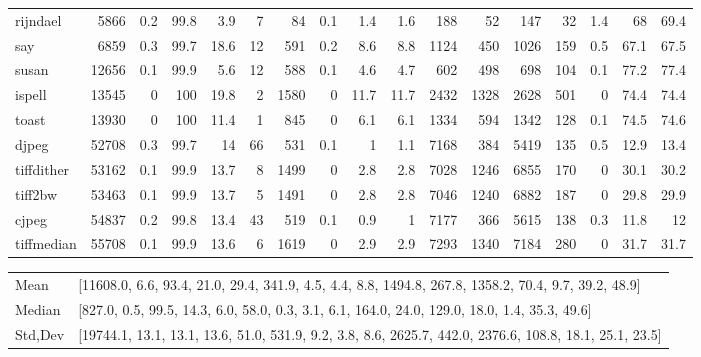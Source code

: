\begin{tabular}{lrrrrrrrrrrrrrrrr}
 rijndael        &           5866 &    0.2 &        99.8 &    3.9 &     7 &      84 &    0.1 &      1.4 &           1.6 &  188 &        52 &      147 &   32 &    1.4 &     68   &          69.4 \\
 say             &           6859 &    0.3 &        99.7 &   18.6 &    12 &     591 &    0.2 &      8.6 &           8.8 & 1124 &       450 &     1026 &  159 &    0.5 &     67.1 &          67.5 \\
 susan           &          12656 &    0.1 &        99.9 &    5.6 &    12 &     588 &    0.1 &      4.6 &           4.7 &  602 &       498 &      698 &  104 &    0.1 &     77.2 &          77.4 \\
 ispell          &          13545 &    0   &       100   &   19.8 &     2 &    1580 &    0   &     11.7 &          11.7 & 2432 &      1328 &     2628 &  501 &    0   &     74.4 &          74.4 \\
 toast           &          13930 &    0   &       100   &   11.4 &     1 &     845 &    0   &      6.1 &           6.1 & 1334 &       594 &     1342 &  128 &    0.1 &     74.5 &          74.6 \\
 djpeg           &          52708 &    0.3 &        99.7 &   14   &    66 &     531 &    0.1 &      1   &           1.1 & 7168 &       384 &     5419 &  135 &    0.5 &     12.9 &          13.4 \\
 tiffdither      &          53162 &    0.1 &        99.9 &   13.7 &     8 &    1499 &    0   &      2.8 &           2.8 & 7028 &      1246 &     6855 &  170 &    0   &     30.1 &          30.2 \\
 tiff2bw         &          53463 &    0.1 &        99.9 &   13.7 &     5 &    1491 &    0   &      2.8 &           2.8 & 7046 &      1240 &     6882 &  187 &    0   &     29.8 &          29.9 \\
 cjpeg           &          54837 &    0.2 &        99.8 &   13.4 &    43 &     519 &    0.1 &      0.9 &           1   & 7177 &       366 &     5615 &  138 &    0.3 &     11.8 &          12   \\
 tiffmedian      &          55708 &    0.1 &        99.9 &   13.6 &     6 &    1619 &    0   &      2.9 &           2.9 & 7293 &      1340 &     7184 &  280 &    0   &     31.7 &          31.7 \\
\hline
\end{tabular}\begin{tabular}{ll}
\hline
 Mean    & [11608.0, 6.6, 93.4, 21.0, 29.4, 341.9, 4.5, 4.4, 8.8, 1494.8, 267.8, 1358.2, 70.4, 9.7, 39.2, 48.9]    \\
 Median  & [827.0, 0.5, 99.5, 14.3, 6.0, 58.0, 0.3, 3.1, 6.1, 164.0, 24.0, 129.0, 18.0, 1.4, 35.3, 49.6]           \\
 Std,Dev & [19744.1, 13.1, 13.1, 13.6, 51.0, 531.9, 9.2, 3.8, 8.6, 2625.7, 442.0, 2376.6, 108.8, 18.1, 25.1, 23.5] \\
\hline
\end{tabular}